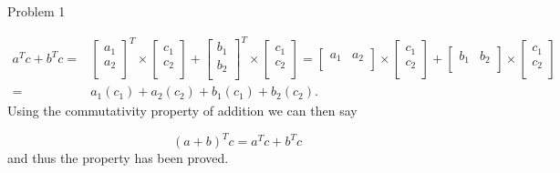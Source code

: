 \begin{problem}{Problem 1}
\begin{highlight}
        \begin{align}
            a^{T}c + b^{T}c = &
            \begin{bmatrix}
                a_{1} \\
                a_{2} \\
            \end{bmatrix}^{T}
            \times 
            \begin{bmatrix}
                c_{1} \\
                c_{2} \\
            \end{bmatrix}
            + 
            \begin{bmatrix}
                b_{1} \\
                b_{2} \\
            \end{bmatrix}^{T}
            \times
            \begin{bmatrix}
                c_{1} \\
                c_{2} \\
            \end{bmatrix}
            =
            \begin{bmatrix}
                a_{1} & a_{2} \\
            \end{bmatrix}
            \times
            \begin{bmatrix}
                c_{1} \\
                c_{2} \\
            \end{bmatrix}
            +
            \begin{bmatrix}
                b_{1} & b_{2} \\
            \end{bmatrix}
            \times
            \begin{bmatrix}
                c_{1} \\
                c_{2} \\
            \end{bmatrix} \\
            = & a_{1}(c_{1}) + a_{2}(c_{2}) + b_{1}(c_{1}) + b_{2}(c_{2}).
        \end{align}
        Using the commutativity property of addition we can then say

        \begin{equation}
            (a + b)^{T}c = a^{T}c + b^{T}c
        \end{equation}
        and thus the property has been proved.
    \end{highlight}


\end{problem}
